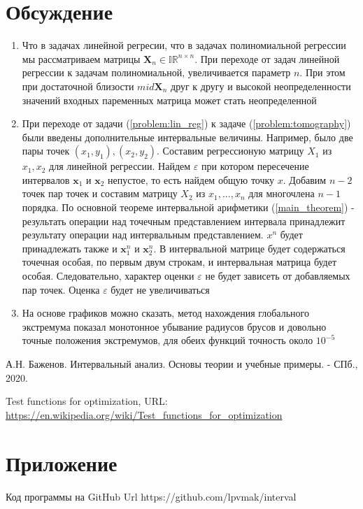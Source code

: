 \documentclass[12pt,a4paper]{article}
\begin{document}
	\section{Обсуждение}
	    \begin{enumerate}
    	    \item Что в задачах линейной регресии, что в задачах полиномиальной регрессии мы рассматриваем матрицы $\mathbf{X}_n\in\mathbb{IR}^{n\times n}$. При переходе от задач линейной регрессии к задачам полиномиальной, увеличивается параметр $n$. При этом при достаточной близости $mid\mathbf{X}_n$ друг к другу и высокой неопределенности значений входных паременных матрица может стать неопределенной
    	   
           \item 
           При переходе от задачи (\ref{problem:lin_reg}) к задаче (\ref{problem:tomography}) были введены дополнительные интервальные величины. Например, было две пары точек $(x_1, y_1), (x_2, y_2)$. Составим регрессионую матрицу $X_1$ из $x_1, x_2$ для линейной регрессии. Найдем $\varepsilon$ при котором пересечение интервалов  $\textbf{x}_1$ и $\textbf{x}_2$ непустое, то есть найдем общую точку $x$. Добавим $n-2$ точек пар точек и составим матрицу $X_2$ из $x_1, ... ,x_n$ для многочлена $n-1$ порядка. По основной теореме интервальной арифметики (\ref{main_theorem}) - результать операции над точечным представлением интервала принадлежит результату операции над интервальным представлением. $x^n$ будет принадлежать также и $\textbf{x}_1^n$ и $\textbf{x}_2^n$. В интервальной матрице будет содержаться точечная особая, по первым двум строкам, и интервальная матрица будет особая.
           Следовательно, характер оценки $\varepsilon$ не будет зависеть от добавляемых пар точек. Оценка $\varepsilon$ будет не увеличиваться
           
    
           
           \item На основе графиков можно сказать, метод нахождения глобального экстремума показал монотонное убывание радиусов брусов и довольно точные положения экстремумов, для обеих функций точность около $10^{-5}$
       
       \end{enumerate}
       
       
       \newpage
	    
	    
	\begin{thebibliography}{9} 
  
         А.Н. Баженов. Интервальный анализ. Основы теории и учебные примеры. - СПб., 2020.

  
		
		 Test functions for optimization, URL: \url{https://en.wikipedia.org/wiki/Test_functions_for_optimization}
		
		
	\end{thebibliography}
        \section{Приложение}
            Код программы на GitHub Url https://github.com/lpvmak/interval
\end{document}

